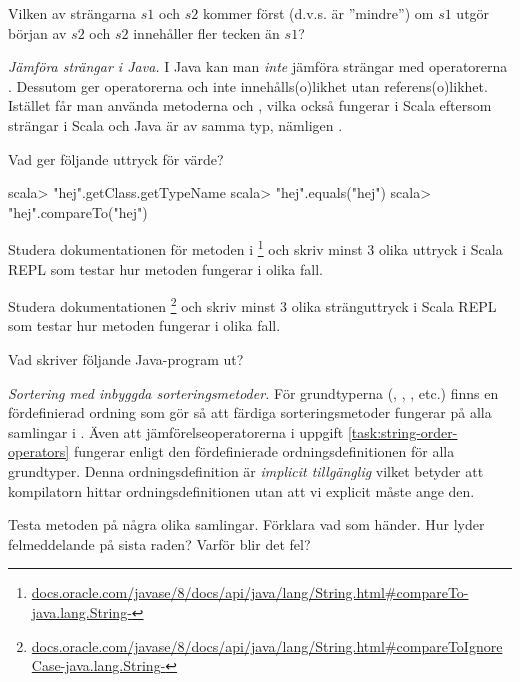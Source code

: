 \Subtask\Pen Vilken av strängarna $s1$ och $s2$ kommer först (d.v.s. är ''mindre'') om $s1$ utgör början av $s2$ och $s2$ innehåller fler tecken än $s1$? 


\Task \emph{Jämföra strängar i Java.} I Java kan man \emph{inte} jämföra strängar med operatorerna \code{< <= > >=}. Dessutom ger operatorerna \code{==} och \code{!=} inte innehålls(o)likhet utan referens(o)likhet. Istället får man använda metoderna  och , vilka också fungerar i Scala eftersom strängar i Scala och Java är av samma typ, nämligen .


\Subtask Vad ger följande uttryck för värde?

\begin{REPL}
scala> "hej".getClass.getTypeName
scala> "hej".equals("hej")
scala> "hej".compareTo("hej")
\end{REPL}


\Subtask Studera dokumentationen för metoden  i \footnote{\href{https://docs.oracle.com/javase/8/docs/api/java/lang/String.html\#compareTo-java.lang.String-}{docs.oracle.com/javase/8/docs/api/java/lang/String.html\#compareTo-java.lang.String-}} och skriv minst 3 olika uttryck i Scala REPL som testar hur metoden fungerar i olika fall. 

\Subtask Studera dokumentationen  \footnote{\href{https://docs.oracle.com/javase/8/docs/api/java/lang/String.html\#compareToIgnoreCase-java.lang.String-}{docs.oracle.com/javase/8/docs/api/java/lang/String.html\#compareToIgnoreCase-java.lang.String-}} och skriv minst 3 olika stränguttryck i Scala REPL som testar hur metoden fungerar i olika fall. 

\Subtask Vad skriver följande Java-program ut?


\Task \emph{Sortering med inbyggda sorteringsmetoder.} För grundtyperna (, , , etc.) finns en fördefinierad ordning som gör så att färdiga sorteringsmetoder fungerar på alla samlingar i . Även att jämförelseoperatorerna i uppgift \ref{task:string-order-operators} fungerar enligt den fördefinierade ordningsdefinitionen för alla grundtyper. Denna ordningsdefinition är \textit{implicit tillgänglig} vilket betyder att kompilatorn hittar ordningsdefinitionen utan att vi explicit måste ange den.

\Subtask Testa metoden  på några olika samlingar. Förklara vad som händer. Hur lyder felmeddelande på sista raden? Varför blir det fel?

